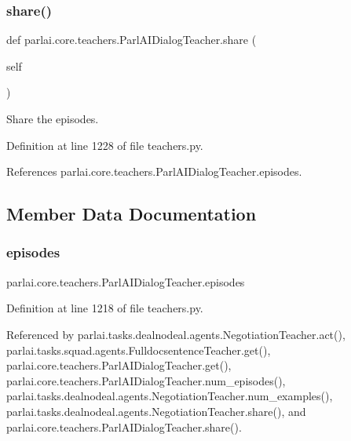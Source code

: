 \subsubsection{\texorpdfstring{share()}{share()}}
{\footnotesize\ttfamily def parlai.\+core.\+teachers.\+Parl\+A\+I\+Dialog\+Teacher.\+share (\begin{DoxyParamCaption}\item[{}]{self }\end{DoxyParamCaption})}

\begin{DoxyVerb}Share the episodes.\end{DoxyVerb}
 

Definition at line 1228 of file teachers.\+py.



References parlai.\+core.\+teachers.\+Parl\+A\+I\+Dialog\+Teacher.\+episodes.



\subsection{Member Data Documentation}
\mbox{\label{classparlai_1_1core_1_1teachers_1_1ParlAIDialogTeacher_a99d92211286cdcc382f723ebc9d272c4}} 
\subsubsection{\texorpdfstring{episodes}{episodes}}
{\footnotesize\ttfamily parlai.\+core.\+teachers.\+Parl\+A\+I\+Dialog\+Teacher.\+episodes}



Definition at line 1218 of file teachers.\+py.



Referenced by parlai.\+tasks.\+dealnodeal.\+agents.\+Negotiation\+Teacher.\+act(), parlai.\+tasks.\+squad.\+agents.\+Fulldocsentence\+Teacher.\+get(), parlai.\+core.\+teachers.\+Parl\+A\+I\+Dialog\+Teacher.\+get(), parlai.\+core.\+teachers.\+Parl\+A\+I\+Dialog\+Teacher.\+num\+\_\+episodes(), parlai.\+tasks.\+dealnodeal.\+agents.\+Negotiation\+Teacher.\+num\+\_\+examples(), parlai.\+tasks.\+dealnodeal.\+agents.\+Negotiation\+Teacher.\+share(), and parlai.\+core.\+teachers.\+Parl\+A\+I\+Dialog\+Teacher.\+share().

